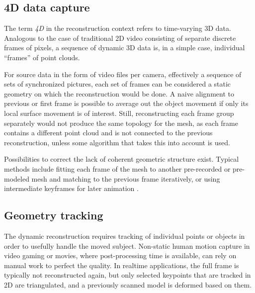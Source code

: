 
\subsection{4D data capture} %

The term \emph{4D} in the reconstruction context refers to time-varying 3D data.
Analogous to the case of traditional 2D video consisting of separate discrete frames of pixels, a sequence of dynamic 3D data is, in a simple case, individual ``frames'' of point clouds.

For source data in the form of video files per camera, effectively a sequence of sets of synchronized pictures, each set of frames can be considered a static geometry on which the reconstruction would be done.
A naive alignment to previous or first frame is possible to average out the object movement if only its local surface movement is of interest.
Still, reconstructing each frame group separately would not produce the same topology for the mesh, as each frame contains a different point cloud and is not connected to the previous reconstruction, unless some algorithm that takes this into account is used.

Possibilities to correct the lack of coherent geometric structure exist.
Typical methods include fitting each frame of the mesh to another pre-recorded or pre-modeled mesh \cite{bickel2007multi,bradley2010high,li2009robust,zhang2007spacetime} and matching to the previous frame iteratively, or using intermediate keyframes for later animation \cite{beeler2011high}.

\subsection{Geometry tracking} %


The dynamic reconstruction requires tracking of individual points or objects in order to usefully handle the moved subject.
Non-static human motion capture in video gaming or movies, where post-processing time is available, can rely on manual work to perfect the quality.
In realtime applications, the full frame is typically not reconstructed again, but only selected keypoints that are tracked in 2D are triangulated, and a previously scanned model is deformed based on them.

